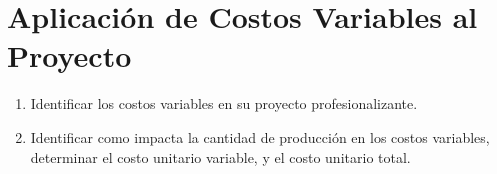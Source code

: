 \documentclass[../main]{subfiles}
\begin{document}
\chapter{Aplicación de Costos Variables al Proyecto}
\begin{enumerate}
  \item Identificar los costos variables en su proyecto profesionalizante.
  \item Identificar como impacta la cantidad de producción en los
    costos variables, determinar el costo unitario variable, y el
    costo unitario total.
\end{enumerate}
\end{document}
